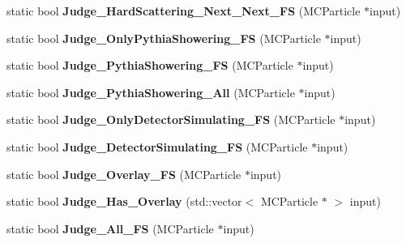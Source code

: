 \begin{DoxyCompactItemize}
\item 
\hypertarget{classToolSet_1_1CMC_a20029373a30ff4642dfbe5ac879ee0ff}{
static bool {\bfseries Judge\_\-HardScattering\_\-Next\_\-Next\_\-FS} (MCParticle $\ast$input)}
\label{classToolSet_1_1CMC_a20029373a30ff4642dfbe5ac879ee0ff}

\item 
\hypertarget{classToolSet_1_1CMC_ae473609376148631113dbf301f800de7}{
static bool {\bfseries Judge\_\-OnlyPythiaShowering\_\-FS} (MCParticle $\ast$input)}
\label{classToolSet_1_1CMC_ae473609376148631113dbf301f800de7}

\item 
\hypertarget{classToolSet_1_1CMC_a47f5a5aff7196a77a729c703ffed1ce7}{
static bool {\bfseries Judge\_\-PythiaShowering\_\-FS} (MCParticle $\ast$input)}
\label{classToolSet_1_1CMC_a47f5a5aff7196a77a729c703ffed1ce7}

\item 
\hypertarget{classToolSet_1_1CMC_a6c340bf257a238e9f68cd251b50599cd}{
static bool {\bfseries Judge\_\-PythiaShowering\_\-All} (MCParticle $\ast$input)}
\label{classToolSet_1_1CMC_a6c340bf257a238e9f68cd251b50599cd}

\item 
\hypertarget{classToolSet_1_1CMC_ab6067e1275a79341e2342906105e16f2}{
static bool {\bfseries Judge\_\-OnlyDetectorSimulating\_\-FS} (MCParticle $\ast$input)}
\label{classToolSet_1_1CMC_ab6067e1275a79341e2342906105e16f2}

\item 
\hypertarget{classToolSet_1_1CMC_afee9479237283cf64d769fb1b1a361ae}{
static bool {\bfseries Judge\_\-DetectorSimulating\_\-FS} (MCParticle $\ast$input)}
\label{classToolSet_1_1CMC_afee9479237283cf64d769fb1b1a361ae}

\item 
\hypertarget{classToolSet_1_1CMC_af61adfde1923ee0bd54f91e88c806c94}{
static bool {\bfseries Judge\_\-Overlay\_\-FS} (MCParticle $\ast$input)}
\label{classToolSet_1_1CMC_af61adfde1923ee0bd54f91e88c806c94}

\item 
\hypertarget{classToolSet_1_1CMC_a257af2810ec961f3e1a71f29bc12154f}{
static bool {\bfseries Judge\_\-Has\_\-Overlay} (std::vector$<$ MCParticle $\ast$ $>$ input)}
\label{classToolSet_1_1CMC_a257af2810ec961f3e1a71f29bc12154f}

\item 
\hypertarget{classToolSet_1_1CMC_a0cdd75e73a26f294c140f9cf2ed196ea}{
static bool {\bfseries Judge\_\-All\_\-FS} (MCParticle $\ast$input)}
\label{classToolSet_1_1CMC_a0cdd75e73a26f294c140f9cf2ed196ea}


\end{DoxyCompactItemize}
